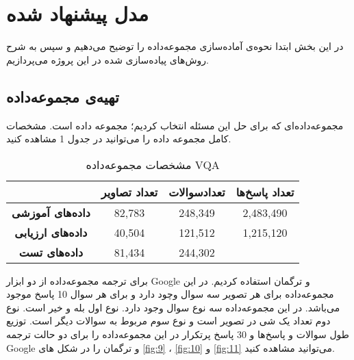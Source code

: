\section{مدل پیشنهاد شده}
{
	در این بخش ابتدا نحوه‌ی آماده‌سازی مجموعه‌داده را توضیح می‌دهیم و سپس به شرح روش‌های پیاده‌سازی شده در این پروژه می‌پردازیم.
	
	\subsection{تهیه‌ی مجموعه‌داده}
	{
		مجموعه‌داده‌ای که برای حل این مسئله انتخاب کردیم؛ مجموعه داده
		 \href{https://visualqa.org/vqa_v1_download.html}{} 
		 است. مشخصات کامل مجموعه داده را می‌توانید در جدول 1 مشاهده کنید.
		 \begin{table}
			 \begin{center}
			 	\begin{tabular}{ c c c c } 
			 		\hline
			 		& \textbf{تعداد تصاویر} & \textbf{تعدادسوالات} & \textbf{تعداد پاسخ‌ها} \\
			 		\hline \hline
			 		\textbf{داده‌های آموزشی} & 82,783 & 248,349 &  2,483,490 \\
					
					\textbf{داده‌های ارزیابی} & 40,504 & 121,512 & 1,215,120 \\
					
					\textbf{داده‌های تست} & 81,434 & 244,302 & \\
					\hline
			 	\end{tabular}
			 \end{center}
		 \caption{مشخصات مجموعه‌داده VQA}
	 	\end{table}
		برای ترجمه مجموعه‌داده از دو ابزار Google‌ و ترگمان استفاده کردیم. در این مجموعه‌داده برای هر تصویر سه سوال وچود دارد و برای هر سوال 10 پاسخ موجود می‌باشد. در این مجموعه‌داده سه نوع سوال وجود دارد. نوع اول بله و خیر است. نوع دوم تعداد یک شی در تصویر است و نوع سوم مربوط به سوالات دیگر است. توزیع طول سوالات و پاسخ‌ها و 30 پاسخ پرتکرار در این مجموعه‌داده را برای دو حالت ترجمه Google‌‌ و ترگمان را در شکل های 
		\ref{fig:9}
		،
		\ref{fig:10}
		و 
		\ref{fig:11}
		می‌توانید مشاهده کنید. 
	}
}
